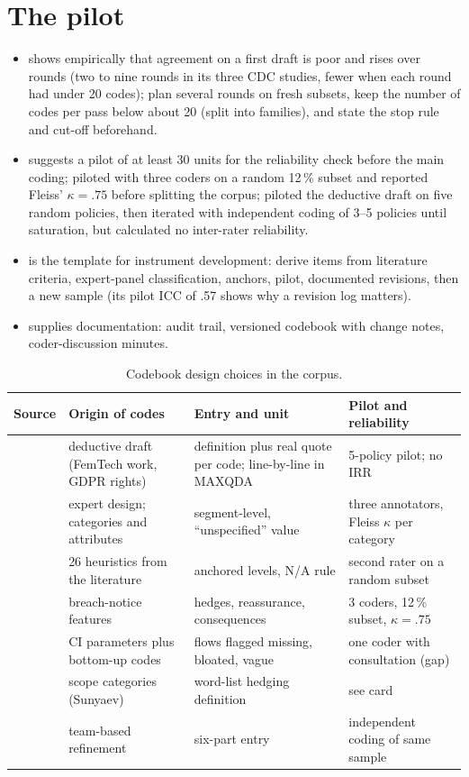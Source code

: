 \section{The pilot}
\begin{itemize}
\item {} shows empirically that agreement on a first draft is poor and rises over rounds (two to nine rounds in its three CDC studies, fewer when each round had under 20 codes); plan several rounds on fresh subsets, keep the number of codes per pass below about 20 (split into families), and state the stop rule and cut-off beforehand.
\item {} suggests a pilot of at least 30 units for the reliability check before the main coding;  piloted with three coders on a random 12\,\% subset and reported Fleiss' $\kappa=.75$ before splitting the corpus;  piloted the deductive draft on five random policies, then iterated with independent coding of 3--5 policies until saturation, but calculated no inter-rater reliability.
\item {} is the template for instrument development: derive items from literature criteria, expert-panel classification, anchors, pilot, documented revisions, then a new sample (its pilot ICC of .57 shows why a revision log matters).
\item {} supplies documentation: audit trail, versioned codebook with change notes, coder-discussion minutes.
\end{itemize}

\begin{table}[t]
\centering\small
\caption{Codebook design choices in the corpus.}
\label{tab:C-design}
\begin{tabularx}{\textwidth}{@{}P{2.5cm}P{3.3cm}YY@{}}
\toprule
\textbf{Source} & \textbf{Origin of codes} & \textbf{Entry and unit} & \textbf{Pilot and reliability}\\
\midrule
{} & deductive draft (FemTech work, GDPR rights) & definition plus real quote per code; line-by-line in MAXQDA & 5-policy pilot; no IRR\\
 & expert design; categories and attributes & segment-level, ``unspecified'' value & three annotators, Fleiss $\kappa$ per category\\
 & 26 heuristics from the literature & anchored levels, N/A rule & second rater on a random subset\\
 & breach-notice features & hedges, reassurance, consequences & 3 coders, 12\,\% subset, $\kappa=.75$\\
 & CI parameters plus bottom-up codes & flows flagged missing, bloated, vague & one coder with consultation (gap)\\
 & scope categories (Sunyaev) & word-list hedging definition & see card\\
 & team-based refinement & six-part entry & independent coding of same sample\\
\bottomrule
\end{tabularx}
\end{table}

